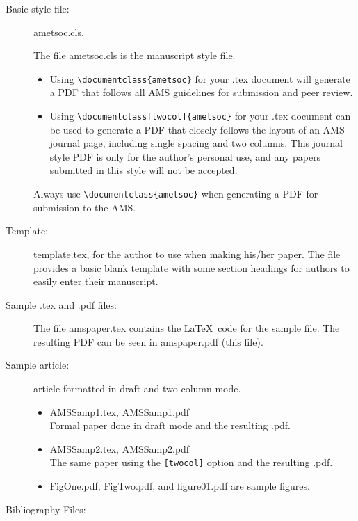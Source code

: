 \documentclass{ametsoc}
\begin{document}
\begin{description}
\item[Basic style file:] ametsoc.cls. 

The file ametsoc.cls is the manuscript style file.  

\begin{itemize}
\item
Using \verb+\documentclass{ametsoc}+ for your .tex document
will 
generate a PDF that follows all AMS guidelines for submission and peer
review.  

\item
Using \verb+\documentclass[twocol]{ametsoc}+ for your .tex document
can be used to generate a PDF that closely
follows the layout of an AMS journal page, including single spacing and two
columns.  This journal style PDF is only for the author's personal use, and
any papers submitted in this style will not be accepted.  
\end{itemize}
Always use \verb+\documentclass{ametsoc}+ 
when generating a PDF for submission to the AMS. 

\item[Template:]
template.tex, for the author to use when making his/her
paper.
The file provides a basic blank template with some
section headings for authors to easily enter their manuscript.

\item[Sample .tex and .pdf files:]
The file amspaper.tex contains the \LaTeX\ code for the sample file.  
The resulting PDF can be seen in amspaper.pdf (this file).


\item[Sample article:] article formatted in draft and two-column mode.

\begin{itemize}
\item
AMSSamp1.tex, AMSSamp1.pdf\\
Formal paper done in draft mode and the resulting .pdf.

\item
AMSSamp2.tex, AMSSamp2.pdf \\
The same paper using the \verb+[twocol]+ option and the resulting .pdf.

\item
FigOne.pdf, FigTwo.pdf, and figure01.pdf are sample figures.


\end{itemize}

\item[Bibliography Files:]


\end{description}
\end{document}
